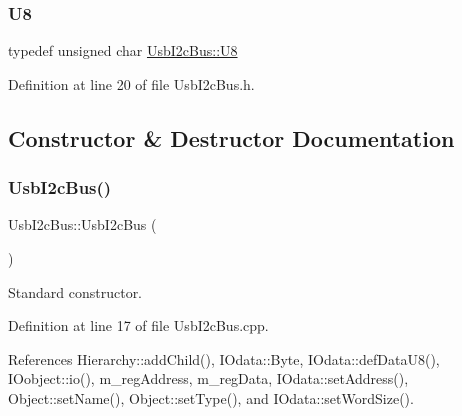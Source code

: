 \subsubsection{\texorpdfstring{U8}{U8}}
{\footnotesize\ttfamily typedef unsigned char \hyperlink{classUsbI2cBus_a06be0e3e19b0f6eee34d3537bb31960e}{Usb\+I2c\+Bus\+::\+U8}}



Definition at line 20 of file Usb\+I2c\+Bus.\+h.



\subsection{Constructor \& Destructor Documentation}
\mbox{\label{classUsbI2cBus_aaad209bcbfd0bcf9fac020100677e723}} 
\subsubsection{\texorpdfstring{Usb\+I2c\+Bus()}{UsbI2cBus()}}
{\footnotesize\ttfamily Usb\+I2c\+Bus\+::\+Usb\+I2c\+Bus (\begin{DoxyParamCaption}{ }\end{DoxyParamCaption})}



Standard constructor. 



Definition at line 17 of file Usb\+I2c\+Bus.\+cpp.



References Hierarchy\+::add\+Child(), I\+Odata\+::\+Byte, I\+Odata\+::def\+Data\+U8(), I\+Oobject\+::io(), m\+\_\+reg\+Address, m\+\_\+reg\+Data, I\+Odata\+::set\+Address(), Object\+::set\+Name(), Object\+::set\+Type(), and I\+Odata\+::set\+Word\+Size().



